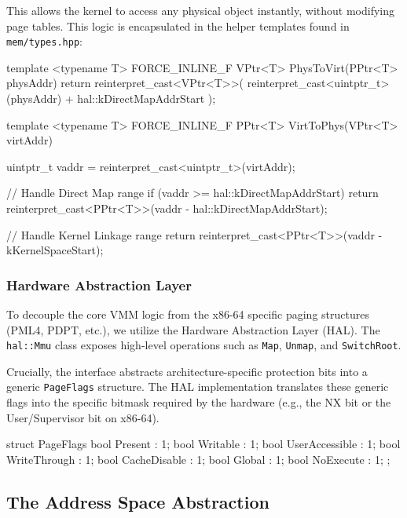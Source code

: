 \documentclass[a4paper,10pt,twoside]{report}
\theoremstyle{definition}
\begin{document}
This allows the kernel to access any physical object instantly, without modifying page tables. This logic is encapsulated in the helper templates found in \texttt{mem/types.hpp}:

\clearpage

\begin{cppcode}[caption={Physical to Virtual Address Translation helpers}, label={lst:phys_to_virt}]
template <typename T>
FORCE_INLINE_F VPtr<T> PhysToVirt(PPtr<T> physAddr)
{
    return reinterpret_cast<VPtr<T>>(
        reinterpret_cast<uintptr_t>(physAddr) + hal::kDirectMapAddrStart
    );
}

template <typename T>
FORCE_INLINE_F PPtr<T> VirtToPhys(VPtr<T> virtAddr)
{
    uintptr_t vaddr = reinterpret_cast<uintptr_t>(virtAddr);
    
    // Handle Direct Map range
    if (vaddr >= hal::kDirectMapAddrStart) {
        return reinterpret_cast<PPtr<T>>(vaddr - hal::kDirectMapAddrStart);
    }

    // Handle Kernel Linkage range
    return reinterpret_cast<PPtr<T>>(vaddr - kKernelSpaceStart);
}
\end{cppcode}

\subsubsection{Hardware Abstraction Layer}

To decouple the core VMM logic from the x86-64 specific paging structures (PML4, PDPT, etc.), we utilize the Hardware Abstraction Layer (HAL). The \texttt{hal::Mmu} class exposes high-level operations such as \texttt{Map}, \texttt{Unmap}, and \texttt{SwitchRoot}. 

Crucially, the interface abstracts architecture-specific protection bits into a generic \texttt{PageFlags} structure. The HAL implementation translates these generic flags into the specific bitmask required by the hardware (e.g., the NX bit or the User/Supervisor bit on x86-64).

\begin{cppcode}[caption={Generic Page Flags Abstraction}, label={lst:page_flags}]
struct PageFlags {
    bool Present : 1;
    bool Writable : 1;
    bool UserAccessible : 1;
    bool WriteThrough : 1;
    bool CacheDisable : 1;
    bool Global : 1;
    bool NoExecute : 1;
};
\end{cppcode}

\subsection{The Address Space Abstraction}
\end{document}
